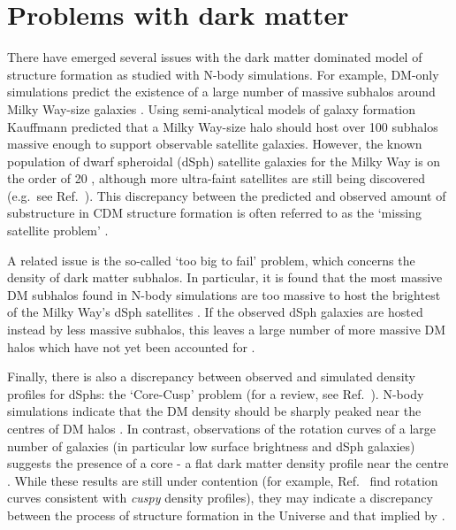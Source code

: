 \section{Problems with dark matter}
\label{sec:intro:problems}
There have emerged several issues with the dark matter dominated model of structure formation as studied with N-body simulations. For example, DM-only simulations predict the existence of a large number of massive subhalos around Milky Way-size galaxies \cite{Springel:2008}. Using semi-analytical models of galaxy formation Kauffmann \etal \cite{Kauffmann:1993} predicted that a Milky Way-size halo should host over 100 subhalos massive enough to support observable satellite galaxies.  However, the known population of dwarf spheroidal (dSph) satellite galaxies for the Milky Way is on the order of 20 \cite{Walker:2009}, although more ultra-faint satellites are still being discovered (e.g.~see Ref.~\cite{Belokurov:2010}). This discrepancy between the predicted and observed amount of substructure in CDM structure formation is often referred to as the `missing satellite problem' \cite{Klypin:1999}.

A related issue is the so-called `too big to fail' problem, which concerns the density of dark matter subhalos. In particular, it is found that the most massive DM subhalos found in N-body simulations are too massive to host the brightest of the Milky Way's dSph satellites \cite{Boylan-Kolchin:2011}. If the observed dSph galaxies are hosted instead by less massive subhalos, this leaves a large number of more massive DM halos which have not yet been accounted for \cite{Garrison-Kimmel:2014}.

Finally, there is also a discrepancy between observed and simulated density profiles for dSphs: the `Core-Cusp' problem (for a review, see Ref.~\cite{deBlok:2009}). N-body simulations indicate that the DM density should be sharply peaked near the centres of DM halos \cite{Dubinski:1991, Navarro:1996}. In contrast, observations of the rotation curves of a large number of galaxies (in particular low surface brightness and dSph galaxies) suggests the presence of a core - a flat dark matter density profile near the centre \cite{Salucci:2001, Donato:2004}. While these results are still under contention (for example, Ref.~\cite{Hayashi:2004} find rotation curves consistent with \textit{cuspy} density profiles), they may indicate a discrepancy between the process of structure formation in the Universe and that implied by \LCDM.

